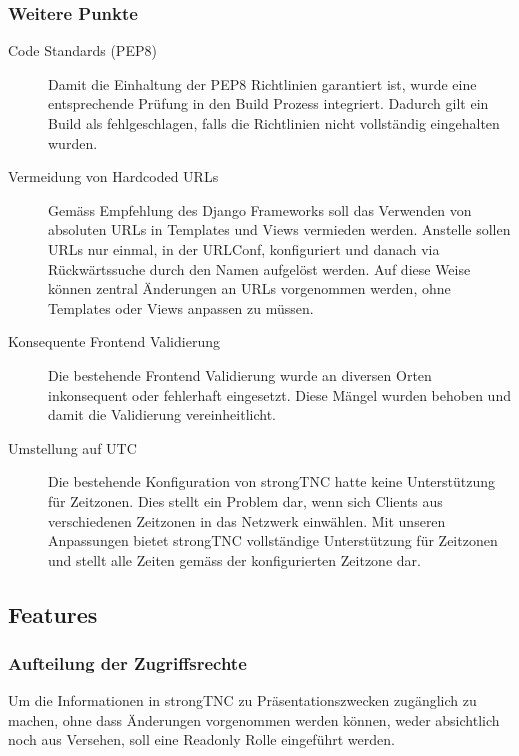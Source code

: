 \subsubsection{Weitere Punkte}
\begin{description}

\item[Code Standards (PEP8)] Damit die Einhaltung der PEP8 Richtlinien
	garantiert ist, wurde eine entsprechende Prüfung in den Build Prozess
	integriert. Dadurch gilt ein Build als fehlgeschlagen, falls die Richtlinien
	nicht vollständig eingehalten wurden.

\item[Vermeidung von Hardcoded URLs] Gemäss Empfehlung des Django Frameworks
	soll das Verwenden von absoluten URLs in Templates und Views vermieden werden.
	Anstelle sollen URLs nur einmal, in der URLConf, konfiguriert und danach via
	Rückwärtssuche durch den Namen aufgelöst werden. Auf diese Weise können
	zentral Änderungen an URLs vorgenommen werden, ohne Templates oder Views
	anpassen zu müssen.

\item[Konsequente Frontend Validierung] Die bestehende Frontend Validierung
	wurde an diversen Orten inkonsequent oder fehlerhaft eingesetzt. Diese Mängel
	wurden behoben und damit die Validierung vereinheitlicht.

\item[Umstellung auf UTC] Die bestehende Konfiguration von strongTNC hatte keine
	Unterstützung für Zeitzonen. Dies stellt ein Problem dar, wenn sich Clients
	aus verschiedenen Zeitzonen in das Netzwerk einwählen. Mit unseren Anpassungen
	bietet strongTNC vollständige Unterstützung für Zeitzonen und stellt alle
	Zeiten gemäss der konfigurierten Zeitzone dar.

\end{description}

\subsection{Features}

\subsubsection{Aufteilung der Zugriffsrechte}
Um die Informationen in strongTNC zu Präsentationszwecken zugänglich zu machen,
ohne dass Änderungen vorgenommen werden können, weder absichtlich noch aus
Versehen, soll eine Readonly Rolle eingeführt werden.

